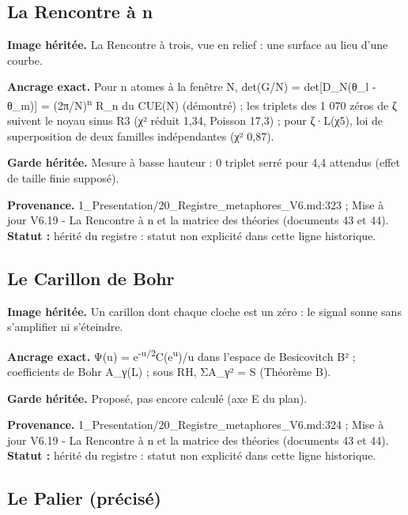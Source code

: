 \documentclass[
  9pt,
  a4paper,
]{article}
\begin{document}
\hypertarget{la-rencontre-uxe0-n}{%
\subsection{La Rencontre à n}\label{la-rencontre-uxe0-n}}

\textbf{Image héritée.} La Rencontre à trois, vue en relief : une
surface au lieu d'une courbe.

\textbf{Ancrage exact.} Pour n atomes à la fenêtre N, det(G/N) =
det{[}D\_N(θ\_l - θ\_m){]} = (2π/N)\textsuperscript{n} R\_n du CUE(N)
(démontré) ; les triplets des 1 070 zéros de ζ suivent le noyau sinus R3
(χ² réduit 1,34, Poisson 17,3) ; pour ζ·L(χ5), loi de superposition de
deux familles indépendantes (χ² 0,87).

\textbf{Garde héritée.} Mesure à basse hauteur : 0 triplet serré pour
4,4 attendus (effet de taille finie supposé).

\textbf{Provenance.} 1\_Presentation/20\_Registre\_metaphores\_V6.md:323
; Mise à jour V6.19 - La Rencontre à n et la matrice des théories
(documents 43 et 44). \textbf{Statut :} hérité du registre : statut non
explicité dans cette ligne historique.

\hypertarget{le-carillon-de-bohr}{%
\subsection{Le Carillon de Bohr}\label{le-carillon-de-bohr}}

\textbf{Image héritée.} Un carillon dont chaque cloche est un zéro : le
signal sonne sans s'amplifier ni s'éteindre.

\textbf{Ancrage exact.} Ψ(u) =
e\textsuperscript{-u/2}C(e\textsuperscript{u})/u dans l'espace de
Besicovitch B² ; coefficients de Bohr A\_γ(L) ; sous RH,
Σ\textbar A\_γ\textbar² = S (Théorème B).

\textbf{Garde héritée.} Proposé, pas encore calculé (axe E du plan).

\textbf{Provenance.} 1\_Presentation/20\_Registre\_metaphores\_V6.md:324
; Mise à jour V6.19 - La Rencontre à n et la matrice des théories
(documents 43 et 44). \textbf{Statut :} hérité du registre : statut non
explicité dans cette ligne historique.

\hypertarget{le-palier-pruxe9cisuxe9}{%
\subsection{Le Palier (précisé)}\label{le-palier-pruxe9cisuxe9}}
\end{document}
